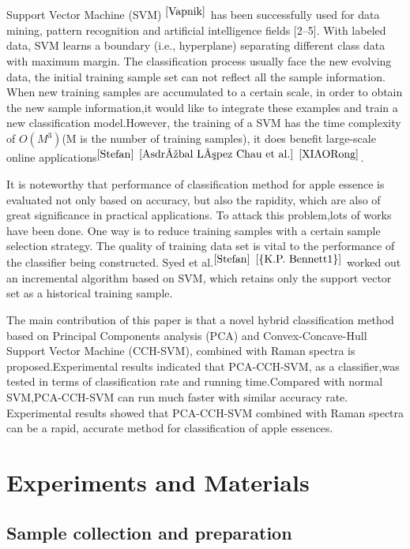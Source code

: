 \documentclass[a4paper]{article}
\begin{document}
Support Vector Machine (SVM) $^{\cite{Vapnik}}$ has been successfully used for data mining, pattern recognition and artiﬁcial intelligence ﬁelds [2–5]. With labeled data, SVM learns a boundary (i.e., hyperplane) separating different class data with maximum margin.
The classification process usually face the new evolving data, the initial training sample set can not reflect all the sample information. When new training samples are accumulated to a certain scale, in order to obtain the new sample information,it would like to integrate these examples and train a new classification model.However, the training of a SVM has the time complexity of $O(M^3)$(M is the number of training samples), it does benefit large-scale online applications$^{\cite{Stefan}}$ $^{\cite{Asdrúbal López Chau et al.}}$ $^{\cite{XIAORong}}$.

It is noteworthy that performance of classification method for apple essence is evaluated not only based on accuracy, but also the rapidity, which are also of great significance in practical applications. To attack this problem,lots of works have been done. One way is to reduce training samples with a certain sample selection strategy. The quality of training data set is vital to the performance of the classifier being constructed. Syed et al.$ ^{\cite{Stefan}}$ $ ^{\cite{{K.P. Bennett1}}}$ worked out an incremental algorithm based on SVM, which retains only the support vector set as a historical training sample.

The main contribution of this paper is that a novel hybrid classification method based on Principal Components analysis (PCA) and Convex-Concave-Hull Support Vector Machine (CCH-SVM), combined with Raman spectra is proposed.Experimental results indicated that PCA-CCH-SVM, as a classifier,was tested in terms of classification rate and running time.Compared with normal SVM,PCA-CCH-SVM can run much faster with similar accuracy rate. Experimental results showed that PCA-CCH-SVM combined with Raman spectra can be a rapid, accurate  method for classification of apple essences.

\section{Experiments and Materials}
\subsection{Sample collection and preparation}
\end{document}
